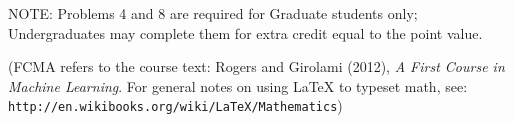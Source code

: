\documentclass[10pt]{article}
\newcommand{\latex}{\LaTeX\xspace}
\begin{document}

NOTE: Problems 4 and 8 are required for Graduate students only; Undergraduates may complete them for extra credit equal to the point value.

(FCMA refers to the course text: Rogers and Girolami (2012), {\em A First Course in Machine Learning}.  For general notes on using \latex to typeset math, see: {\tt http://en.wikibooks.org/wiki/LaTeX/Mathematics})
\vspace{.5cm}

\end{document}
